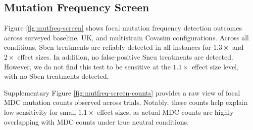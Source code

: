 \subsection{Mutation Frequency Screen}



Figure \ref{fig:mutfreq-screen} shows focal mutation frequency detection outcomes across surveyed baseline, UK, and multistrain Covasim configurations.
Across all conditions, Sben treatments are reliably detected in all instances for $1.3\times$ and $2\times$ effect sizes.
In addition, no false-positive Sneu treatments are detected.
However, we do not find this test to be sensitive at the $1.1\times$ effect size level, with no Sben treatments detected.

Supplementary Figure \ref{fig:mutfreq-screen-counts} provides a raw view of focal MDC mutation counts observed across trials.
Notably, these counts help explain low sensitivity for small $1.1\times$ effect sizes, as actual MDC counts are highly overlapping with MDC counts under true neutral conditions.
